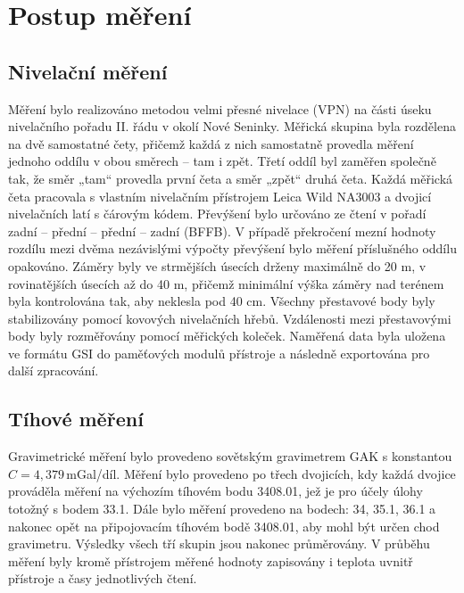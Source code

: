 \section{Postup měření}

\subsection{Nivelační měření}

Měření bylo realizováno metodou velmi přesné nivelace (VPN) na části úseku nivelačního pořadu II. řádu v okolí Nové Seninky. Měřická skupina byla rozdělena na dvě samostatné čety, přičemž každá z nich samostatně provedla měření jednoho oddílu v obou směrech – tam i zpět. Třetí oddíl byl zaměřen společně tak, že směr „tam“ provedla první četa a směr „zpět“ druhá četa. Každá měřická četa pracovala s vlastním nivelačním přístrojem Leica Wild NA3003 a dvojicí nivelačních latí s čárovým kódem. Převýšení bylo určováno ze čtení v pořadí zadní – přední – přední – zadní (BFFB). V případě překročení mezní hodnoty rozdílu mezi dvěma nezávislými výpočty převýšení bylo měření příslušného oddílu opakováno. Záměry byly ve strmějších úsecích drženy maximálně do 20 m, v rovinatějších úsecích až do 40 m, přičemž minimální výška záměry nad terénem byla kontrolována tak, aby neklesla pod 40 cm. Všechny přestavové body byly stabilizovány pomocí kovových nivelačních hřebů. Vzdálenosti mezi přestavovými body byly rozměřovány pomocí měřických koleček. Naměřená data byla uložena ve formátu GSI do paměťových modulů přístroje a následně exportována pro další zpracování.

\subsection{Tíhové měření}

Gravimetrické měření bylo provedeno sovětským gravimetrem GAK s konstantou $C = 4,379\,$mGal/díl. Měření bylo provedeno po třech dvojicích, kdy každá dvojice prováděla měření na výchozím tíhovém bodu 3408.01, jež je pro účely úlohy totožný s bodem 33.1. Dále bylo měření provedeno na bodech: 34, 35.1, 36.1 a nakonec opět na připojovacím tíhovém bodě 3408.01, aby mohl být určen chod gravimetru. Výsledky všech tří skupin jsou nakonec průměrovány. V průběhu měření byly kromě přístrojem měřené hodnoty zapisovány i teplota uvnitř přístroje a časy jednotlivých čtení. 